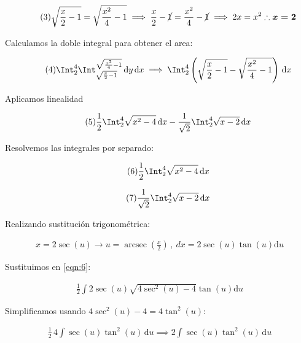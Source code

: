 \documentclass[12pt]{article}
\DeclareMathOperator{\arcsec}{arcsec}
\begin{document}
\begin{equation}\tag{3}
	\sqrt{\frac{x}{2}-1}=\sqrt{\frac{x^2}{4}-1} \implies \frac{x}{2}-\cancel{1}=\frac{x^2}{4}-\cancel{1} \implies 2x = x^2 \therefore \boldsymbol{x=2}
\end{equation}

\noindent Calculamos la doble integral para obtener el area:

\begin{equation}\tag{4}
	\Int_2^4 \Int_{\sqrt{\frac{x}{2}-1}}^{\sqrt{\frac{x^2}{4}-1}} \, \mathrm{d}y \,\mathrm{d}x \implies \Int_2^4 \left(\sqrt{\frac{x}{2}-1} - \sqrt{\frac{x^2}{4}-1}\right)\, \mathrm{d}x
\end{equation}

\noindent Aplicamos linealidad

\begin{equation}\label{eqn:5}\tag{5}
	\frac{1}{2} \Int_2^4 \sqrt{x^2-4}\, \mathrm{d}x - \frac{1}{\sqrt{2}} \Int_2^4 \sqrt{x-2}\, \mathrm{d}x
\end{equation}

\noindent Resolvemos las integrales por separado:

\begin{equation}\label{eqn:6}\tag{6}
	\frac{1}{2} \Int_2^4 \sqrt{x^2-4}\, \mathrm{d}x
\end{equation}

\begin{equation}\label{eqn:7}\tag{7}
	\frac{1}{\sqrt{2}} \Int_2^4 \sqrt{x-2}\, \mathrm{d}x
\end{equation}

\noindent Realizando sustitución trigonométrica:

\begin{align*}
	x = 2 \sec(u) \to u = \arcsec(\frac{x}{2})\, , \ dx=2\sec(u)\tan(u) \mathrm{d}u
\end{align*}

\noindent Sustituimos en \eqref{eqn:6}:

\begin{align*}
	\frac{1}{2} \int 2\sec(u)\sqrt{4\sec^2(u)-4}\tan(u) \mathrm{d}u
\end{align*}

\noindent Simplificamos usando $4\sec^2(u)-4 = 4\tan^2(u)$:

\begin{align*}
	\frac{1}{2}\, 4\int \sec(u)\tan^2(u)\, \mathrm{d}u \implies 2\int \sec(u)\tan^2(u)\, \mathrm{d}u
\end{align*}
\end{document}
